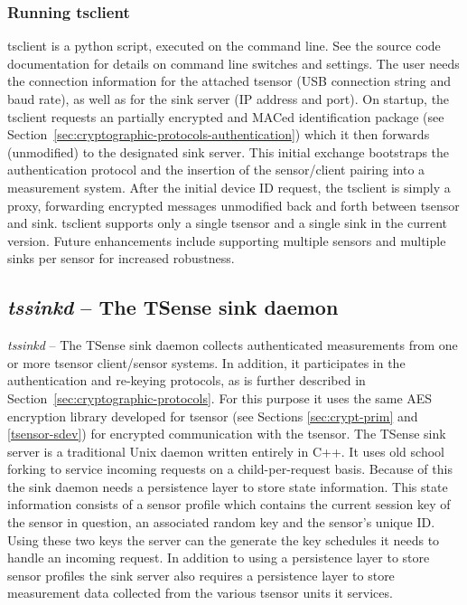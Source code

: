 \subsubsection{Running tsclient}

tsclient is a python script, executed on the command line. See the source code documentation for details on command line switches and settings. The user needs the connection information for the attached tsensor (USB connection string and baud rate), as well as for the sink server (IP address and port). On startup, the tsclient requests an partially encrypted and MACed identification package (see Section~\ref{sec:cryptographic-protocols-authentication}) which it then forwards (unmodified) to the designated sink server. This initial exchange bootstraps the authentication protocol and the insertion of the sensor/client pairing into a measurement system. After the initial device ID request, the tsclient is simply a proxy, forwarding encrypted messages unmodified back and forth between tsensor and sink. tsclient supports only a single tsensor and a single sink in the current version. Future enhancements include supporting multiple sensors and multiple sinks per sensor for increased robustness.

\subsection{\textit{tssinkd} -- The TSense sink daemon}

\textit{tssinkd} -- The TSense sink daemon collects authenticated measurements from one or more tsensor client/sensor systems. In addition, it participates in the authentication and re-keying protocols, as is further described in Section~\ref{sec:cryptographic-protocols}.  For this purpose it uses the same AES encryption library developed for tsensor (see Sections \ref{sec:crypt-prim} and \ref{tsensor-sdev}) for encrypted communication with the tsensor.  The TSense sink server is a traditional Unix daemon written entirely in C++. It uses old school forking to service incoming requests on a child-per-request basis. Because of this the sink daemon needs a persistence layer to store state information. This state information consists of a sensor profile which contains the current session key of the sensor in question, an associated random key and the sensor's unique ID. Using these two keys the server can the generate the key schedules it needs to handle an incoming request. In addition to using a persistence layer to store sensor profiles the sink server also requires a persistence layer to store measurement data collected from the various tsensor units it services.\\

